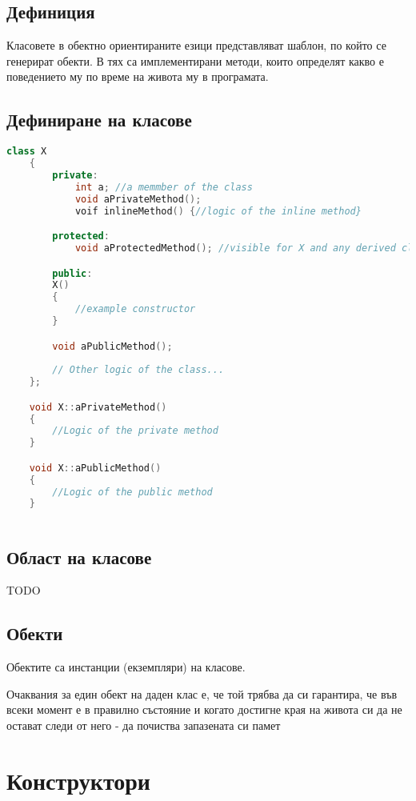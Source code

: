 \documentclass[fleqn,12pt]{article}
\begin{document}
\subsection{Дефиниция}
Класовете в обектно ориентираните езици представляват шаблон, по който се генерират обекти. В тях са имплементирани методи, които определят какво е поведението му по време на живота му в програмата. 


\subsection{Дефиниране на класове}
\begin{lstlisting}[language=C++, caption=Example sckeletal definition of a class]
    class X
    {
        private:
            int a; //a memmber of the class
            void aPrivateMethod();
            voif inlineMethod() {//logic of the inline method}

        protected:
            void aProtectedMethod(); //visible for X and any derived class of X

        public:
        X() 
        {
            //example constructor
        }

        void aPublicMethod();
    
        // Other logic of the class...
    };

    void X::aPrivateMethod()
    {
        //Logic of the private method
    }

    void X::aPublicMethod()
    {
        //Logic of the public method
    }
    
\end{lstlisting}


\subsection{Област на класове}
TODO

\subsection{Обекти}
Обектите са инстанции (екземпляри) на класове.

Очаквания за един обект на даден клас е, че той трябва да си гарантира, че във всеки момент е в правилно състояние и когато достигне края на живота си да не остават следи от него - да почиства запазената си памет


\section{Конструктори}
\end{document}
